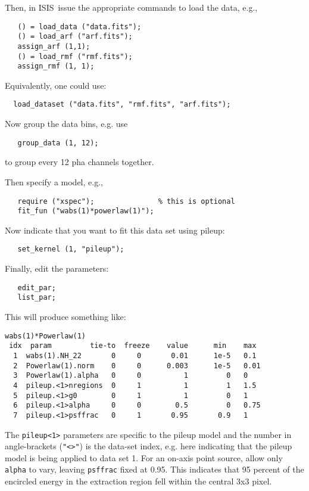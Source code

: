 \documentclass{book}
\newcommand{\isisx}{{\sc ISIS~}}
\begin{document}
Then,  in \isisx issue the appropriate commands to load the data, e.g.,
\begin{verbatim}
   () = load_data ("data.fits");
   () = load_arf ("arf.fits");
   assign_arf (1,1);
   () = load_rmf ("rmf.fits");
   assign_rmf (1, 1);
\end{verbatim}
Equivalently, one could use:
\begin{verbatim}
  load_dataset ("data.fits", "rmf.fits", "arf.fits");
\end{verbatim}

Now group the data bins, e.g. use
\begin{verbatim}
   group_data (1, 12);
\end{verbatim}
to group every 12 pha channels together.

Then specify a model, e.g.,
\begin{verbatim}
   require ("xspec");               % this is optional
   fit_fun ("wabs(1)*powerlaw(1)");
\end{verbatim}

Now indicate that you want to fit this data set using pileup:
\begin{verbatim}
   set_kernel (1, "pileup");
\end{verbatim}

Finally, edit the parameters:
\begin{verbatim}
   edit_par;
   list_par;
\end{verbatim}

This will produce something like:
\begin{verbatim}
wabs(1)*Powerlaw(1)
 idx  param         tie-to  freeze    value      min    max
  1  wabs(1).NH_22       0     0       0.01      1e-5   0.1
  2  Powerlaw(1).norm    0     0      0.003      1e-5   0.01
  3  Powerlaw(1).alpha   0     0          1         0   0
  4  pileup.<1>nregions  0     1          1         1   1.5
  5  pileup.<1>g0        0     1          1         0   1
  6  pileup.<1>alpha     0     0        0.5         0   0.75
  7  pileup.<1>psffrac   0     1       0.95       0.9   1
\end{verbatim}

The \verb|pileup<1>| parameters are specific to the pileup model and the
number in angle-brackets (\verb|"<>"|) is the data-set index, e.g. here
indicating that the pileup model is being applied to data set 1.
For an on-axis point source, allow only \verb|alpha| to vary, leaving
\verb|psffrac| fixed at 0.95.  This indicates that 95 percent
of the encircled energy in the extraction region fell within the
central 3x3 pixel.
\end{document}
